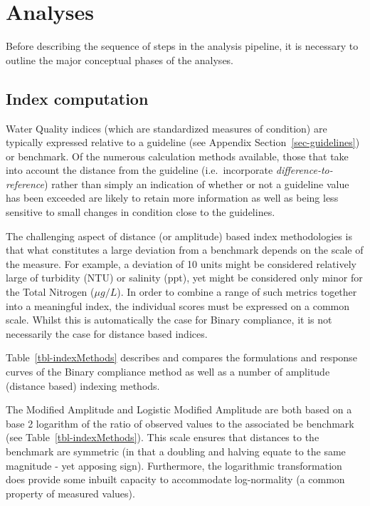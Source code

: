 \documentclass[
  8pt,
  a4paper]{article}
\begin{document}
\section{Analyses}\label{analyses}

Before describing the sequence of steps in the analysis pipeline, it is
necessary to outline the major conceptual phases of the analyses.

\subsection{Index computation}\label{sec-index-computation}

Water Quality indices (which are standardized measures of condition) are
typically expressed relative to a guideline (see Appendix
Section~\ref{sec-guidelines}) or benchmark. Of the numerous calculation
methods available, those that take into account the distance from the
guideline (i.e.~incorporate \emph{difference-to-reference}) rather than
simply an indication of whether or not a guideline value has been
exceeded are likely to retain more information as well as being less
sensitive to small changes in condition close to the guidelines.

The challenging aspect of distance (or amplitude) based index
methodologies is that what constitutes a large deviation from a
benchmark depends on the scale of the measure. For example, a deviation
of 10 units might be considered relatively large of turbidity (NTU) or
salinity (ppt), yet might be considered only minor for the Total
Nitrogen (\(\mu g/L\)). In order to combine a range of such metrics
together into a meaningful index, the individual scores must be
expressed on a common scale. Whilst this is automatically the case for
Binary compliance, it is not necessarily the case for distance based
indices.

Table~\ref{tbl-indexMethods} describes and compares the formulations and
response curves of the Binary compliance method as well as a number of
amplitude (distance based) indexing methods.

The Modified Amplitude and Logistic Modified Amplitude are both based on
a base 2 logarithm of the ratio of observed values to the associated be
benchmark (see Table~\ref{tbl-indexMethods}). This scale ensures that
distances to the benchmark are symmetric (in that a doubling and halving
equate to the same magnitude - yet apposing sign). Furthermore, the
logarithmic transformation does provide some inbuilt capacity to
accommodate log-normality (a common property of measured values).
\end{document}
